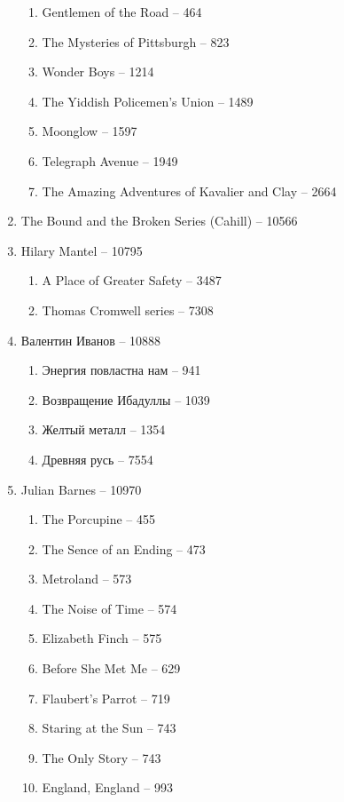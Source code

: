 \documentclass[a4paper, 11pt]{proc} %
\begin{document}
\begin{enumerate}
\begin{enumerate}
            \item Gentlemen of the Road -- 464
            \item The Mysteries of Pittsburgh -- 823
            \item Wonder Boys -- 1214
            \item The Yiddish Policemen's Union -- 1489
            \item Moonglow -- 1597
            \item Telegraph Avenue -- 1949
            \item The Amazing Adventures of Kavalier and Clay -- 2664
        \end{enumerate}
    \item The Bound and the Broken Series (Cahill) -- 10566
    \item Hilary Mantel -- 10795
        \begin{enumerate}
            \item A Place of Greater Safety -- 3487
            \item Thomas Cromwell series -- 7308
        \end{enumerate}
    \item Валентин Иванов -- 10888
        \begin{enumerate}
            \item Энергия повластна нам -- 941
            \item Возвращение Ибадуллы -- 1039
            \item Желтый металл -- 1354
            \item Древняя русь -- 7554
        \end{enumerate}
    \item Julian Barnes -- 10970
        \begin{enumerate}
            \item The Porcupine -- 455
            \item The Sence of an Ending -- 473
            \item Metroland -- 573
            \item The Noise of Time -- 574
            \item Elizabeth Finch -- 575
            \item Before She Met Me -- 629
            \item Flaubert's Parrot -- 719
            \item Staring at the Sun -- 743
            \item The Only Story -- 743
            \item England, England -- 993

\end{enumerate}
\end{enumerate}
\end{document}
